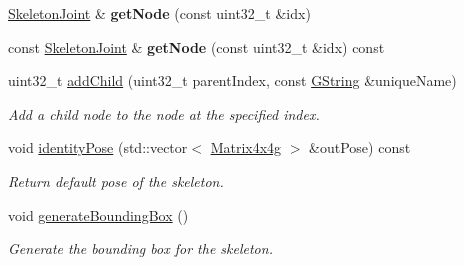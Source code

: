 \begin{Indent}
\begin{DoxyCompactItemize}
\item 
\mbox{\label{classrev_1_1_skeleton_a39bfc43f07ca5c9f463fd70accae2801}} 
\mbox{\hyperlink{classrev_1_1_skeleton_joint}{Skeleton\+Joint}} \& {\bfseries get\+Node} (const uint32\+\_\+t \&idx)
\item 
\mbox{\label{classrev_1_1_skeleton_ababdca72b05ab41792b6f0e3063f53dc}} 
const \mbox{\hyperlink{classrev_1_1_skeleton_joint}{Skeleton\+Joint}} \& {\bfseries get\+Node} (const uint32\+\_\+t \&idx) const
\item 
uint32\+\_\+t \mbox{\hyperlink{classrev_1_1_skeleton_a34309a211bf14c61cdf910746de75c80}{add\+Child}} (uint32\+\_\+t parent\+Index, const \mbox{\hyperlink{classrev_1_1_g_string}{G\+String}} \&unique\+Name)
\begin{DoxyCompactList}\small\item\em Add a child node to the node at the specified index. \end{DoxyCompactList}\item 
void \mbox{\hyperlink{classrev_1_1_skeleton_a3fcd885297975b4ce830363d7255fdf0}{identity\+Pose}} (std\+::vector$<$ \mbox{\hyperlink{classrev_1_1_square_matrix}{Matrix4x4g}} $>$ \&out\+Pose) const
\begin{DoxyCompactList}\small\item\em Return default pose of the skeleton. \end{DoxyCompactList}\item 
\mbox{\label{classrev_1_1_skeleton_ab3de46f7df060875c8cd82b16ddd5a00}} 
void \mbox{\hyperlink{classrev_1_1_skeleton_ab3de46f7df060875c8cd82b16ddd5a00}{generate\+Bounding\+Box}} ()
\begin{DoxyCompactList}\small\item\em Generate the bounding box for the skeleton. \end{DoxyCompactList}\end{DoxyCompactItemize}
\end{Indent}
